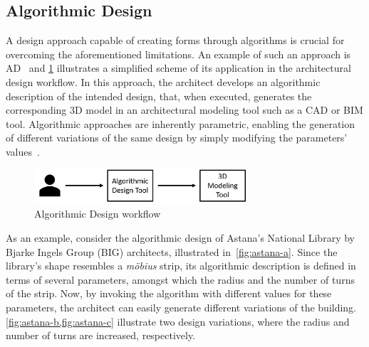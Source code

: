 \subsection{Algorithmic Design}
\label{ssec:ad}
	A design approach capable of creating forms through algorithms is crucial for overcoming the aforementioned limitations. An example of such an approach is \ac{AD}~\cite{Branco2017AD} and \cref{fig:algorithmicdesign} illustrates a simplified scheme of its application in the architectural design workflow. In this approach, the architect develops an algorithmic description of the intended design, that, when executed, generates the corresponding 3D model in an architectural modeling tool such as a \ac{CAD} or \ac{BIM} tool. Algorithmic approaches are inherently parametric, enabling the generation of different variations of the same design by simply modifying the parameters' values~\cite{Leitao2014GD}. 
	
\begin{figure}[htbp]
\centering
\includegraphics[width=0.70\textwidth]{./Images/Introduction/AlgorithmicArchitecturalDesign.png}
\caption[General view of the Algorithmic Design Approach]{Algorithmic Design workflow}
\label{fig:algorithmicdesign}
\end{figure}
	
	As an example, consider the algorithmic design of Astana's National Library by Bjarke Ingels Group (BIG) architects, illustrated in~\cref{fig:astana-a}. Since the library's shape resembles a \textit{möbius} strip, its algorithmic description is defined in terms of several parameters, amongst which the radius and the number of turns of the strip. Now, by invoking the algorithm with different values for these parameters, the architect can easily generate different variations of the building. \cref{fig:astana-b,fig:astana-c} illustrate two design variations, where the radius and number of turns are increased, respectively.
	
